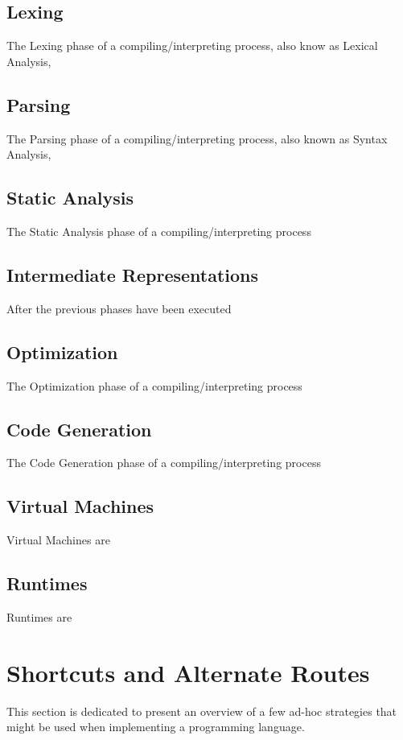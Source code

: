 \subsection{Lexing}
The Lexing phase of a compiling/interpreting process, also know as Lexical Analysis, 

\subsection{Parsing}
The Parsing phase of a compiling/interpreting process, also known as Syntax Analysis,

\subsection{Static Analysis}
The Static Analysis phase of a compiling/interpreting process

\subsection{Intermediate Representations}
After the previous phases have been executed

\subsection{Optimization}
The Optimization phase of a compiling/interpreting process

\subsection{Code Generation}
The Code Generation phase of a compiling/interpreting process


\subsection{Virtual Machines}
Virtual Machines are 

\subsection{Runtimes}
Runtimes are

\section{Shortcuts and Alternate Routes}
This section is dedicated to present an overview of a few ad-hoc strategies that might be used when implementing a programming language.

